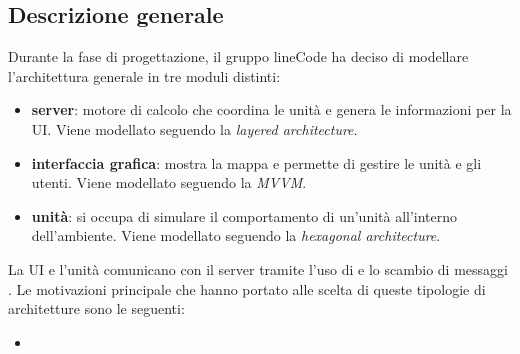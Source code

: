 \subsection{Descrizione generale}
Durante la fase di progettazione, il gruppo lineCode ha deciso di modellare l'architettura generale in tre moduli distinti:
\begin{itemize}
	\item \textbf{server}: motore di calcolo che coordina le unità e genera le informazioni per la UI. Viene modellato seguendo la \textit{layered architecture}.
	\item \textbf{interfaccia grafica}: mostra la mappa e permette di gestire le unità e gli utenti. Viene modellato seguendo la \textit{MVVM}.
	\item \textbf{unità}: si occupa di simulare il comportamento di un'unità all'interno dell'ambiente. Viene modellato seguendo la \textit{hexagonal architecture}. 
\end{itemize}
La UI e l'unità comunicano con il server tramite l'uso di  e lo scambio di messaggi .
Le motivazioni principale che hanno portato alle scelta di queste tipologie di architetture sono le seguenti:
\begin{itemize}
	\item
\end{itemize}

